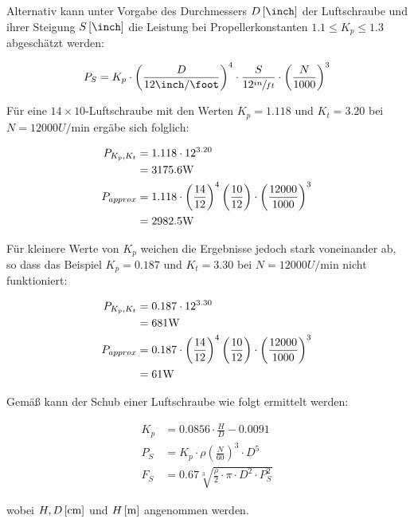 \bigbreak

Alternativ kann unter Vorgabe des Durchmessers $D \withunit{\inch}$ der Luftschraube und ihrer Steigung $S \withunit{\inch}$ die Leistung bei Propellerkonstanten $1.1 \leq K_p \leq 1.3$ abgeschätzt werden:

\begin{align}
	P_S = K_p \cdot \left(\frac{D}{12 \si{\inch\per\foot}}\right)^4 \cdot \frac{S}{12 \sfrac{in}{ft}} \cdot \left(\frac{N}{1000}\right)^3
\end{align}

Für eine $14\times 10$-Luftschraube mit den Werten $K_p = 1.118$ und $K_t = 3.20$ bei $N = 12000 \si{U\per\minute}$  ergäbe sich folglich:

\begin{align}
	P_{K_p,K_t} &= 1.118 \cdot 12^{3.20} \\ &= 3175.6 \si{\watt} \notag\\
	P_{approx} &= 1.118 \cdot \left(\frac{14}{12}\right)^4 \left(\frac{10}{12}\right) \cdot \left(\frac{12000}{1000}\right)^3 \\ &= 2982.5 \si{\watt} \notag
\end{align}

Für kleinere Werte von $K_p$ weichen die Ergebnisse jedoch stark voneinander ab, so dass das Beispiel $K_p = 0.187$ und $K_t = 3.30$ bei $N = 12000 \si{U\per\minute}$  nicht funktioniert:

\begin{align}
	P_{K_p,K_t} &= 0.187 \cdot 12^{3.30} \\ &= 681 \si{\watt} \notag\\
	P_{approx} &= 0.187 \cdot \left(\frac{14}{12}\right)^4 \left(\frac{10}{12}\right) \cdot \left(\frac{12000}{1000}\right)^3 \\ &= 61 \si{\watt} \notag
\end{align}

\bigbreak

Gemäß \cite{standschub} kann der Schub einer Luftschraube wie folgt ermittelt werden:

\begin{align}
	K_p &= 0.0856 \cdot \frac{H}{D} - 0.0091 \\
	P_S &= K_p \cdot \rho \left(\frac{N}{60}\right)^3 \cdot D^5 \\
	F_S &= 0.67 \sqrt[3]{\frac{\rho}{2}\cdot\pi \cdot D^2 \cdot P_S^2}
\end{align}

wobei $H,D \left[\si{\centi\meter}\right]$ und $H \left[\si{\meter}\right]$ angenommen werden.

